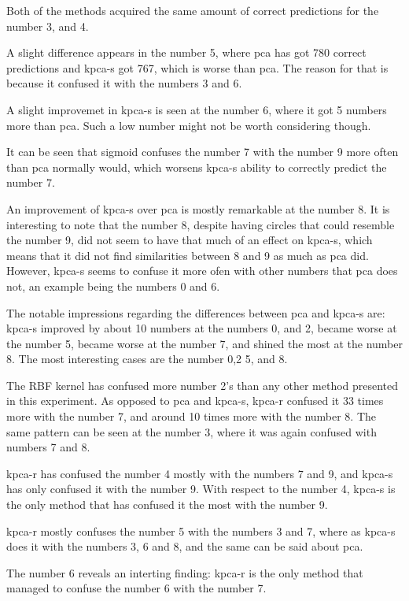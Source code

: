 Both of the methods acquired the same amount of correct predictions for the number 3, and 4.

A slight difference appears in the number 5, where \gls{pca} has got 780 correct predictions and \gls{kpca-s} got 767, which is worse than \gls{pca}. The reason for that is because it confused it with the numbers 3 and 6.


A slight improvemet in \gls{kpca-s} is seen at the number 6, where it got 5 numbers more than \gls{pca}. Such a low number might not be worth considering though.

It can be seen that sigmoid confuses the number 7 with the number 9 more often than \gls{pca} normally would, which worsens \gls{kpca-s} ability to correctly predict the number 7.

An improvement of \gls{kpca-s} over \gls{pca} is mostly remarkable at the number 8. It is interesting to note that the number 8, despite having circles that could resemble the number 9, did not seem to have that much of an effect on \gls{kpca-s}, which means that it did not find similarities between 8 and 9 as much as \gls{pca} did. However, \gls{kpca-s} seems to confuse it more ofen with other numbers that \gls{pca} does not, an example being the numbers 0 and 6.


The notable impressions regarding the differences between \gls{pca} and \gls{kpca-s} are: \gls{kpca-s} improved by about 10 numbers at the numbers 0, and 2, became worse at the number 5, became worse at the number 7, and shined the most at the number 8. The most interesting cases are the number 0,2 5, and 8.


The RBF kernel has confused more number 2's than any other method presented in this experiment. As opposed to \gls{pca} and \gls{kpca-s}, \gls{kpca-r} confused it 33 times more with the number 7, and around 10 times more with the number 8. The same pattern can be seen at the number 3, where it was again confused with numbers 7 and 8.


\gls{kpca-r} has confused the number 4 mostly with the numbers 7 and 9, and \gls{kpca-s} has only confused it with the number 9. With respect to the number 4, \gls{kpca-s} is the only method that has confused it the most with the number 9.


\gls{kpca-r} mostly confuses the number 5 with the numbers 3 and 7, where as \gls{kpca-s} does it with the numbers 3, 6 and 8, and the same can be said about \gls{pca}.


The number 6 reveals an interting finding: \gls{kpca-r} is the only method that managed to confuse the number 6 with the number 7.

